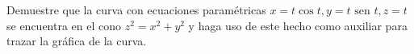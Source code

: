 \item Demuestre que la curva con ecuaciones paramétricas $x = t \cos t, y = t \text{ sen } t, z = t$ se encuentra en el cono $z^2 = x^2 + y^2$ y haga uso de este hecho como auxiliar para trazar la gráfica de la curva.
